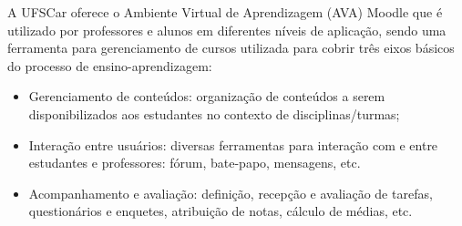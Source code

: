 A UFSCar oferece o Ambiente Virtual de Aprendizagem (AVA) Moodle que é utilizado por professores e alunos em diferentes níveis de aplicação, sendo uma ferramenta para gerenciamento de cursos utilizada para cobrir três eixos básicos do processo de ensino-aprendizagem:
\begin{itemize}
    \item Gerenciamento de conteúdos: organização de conteúdos a serem disponibilizados aos estudantes no contexto de disciplinas/turmas;
    \item Interação entre usuários: diversas ferramentas para interação com e entre estudantes e professores: fórum, bate-papo, mensagens, etc.
    \item Acompanhamento e avaliação: definição, recepção e avaliação de tarefas, questionários e enquetes, atribuição de notas, cálculo de médias, etc.
\end{itemize}








